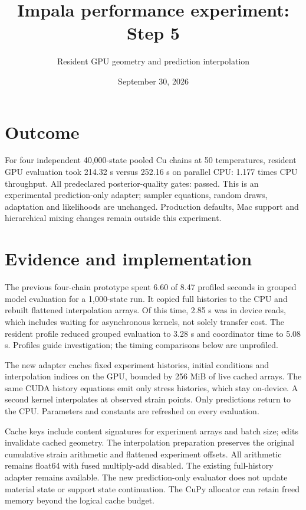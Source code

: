 \documentclass[11pt]{article}
\title{Impala performance experiment: Step 5}
\author{Resident GPU geometry and prediction interpolation}
\date{September 30, 2026}
\begin{document}
\maketitle
\section*{Outcome}
For four independent 40,000-state pooled Cu chains at 50 temperatures, resident
GPU evaluation took 214.32 s versus 252.16 s on parallel CPU:
1.177 times CPU throughput. All predeclared posterior-quality gates: passed.
This is an experimental prediction-only adapter; sampler equations, random draws,
adaptation and likelihoods are unchanged. Production defaults, Mac support and
hierarchical mixing changes remain outside this experiment.
\section*{Evidence and implementation}
The previous four-chain prototype spent 6.60 of 8.47 profiled seconds in grouped
model evaluation for a 1,000-state run. It copied full histories to the CPU and
rebuilt flattened interpolation arrays. Of this time, 2.85 s was in device reads,
which includes waiting for asynchronous kernels, not solely transfer cost.
The resident profile reduced grouped evaluation to 3.28 s and coordinator time
to 5.08 s. Profiles guide investigation; the timing comparisons below are unprofiled.

The new adapter caches fixed experiment histories, initial conditions and
interpolation indices on the GPU, bounded by 256 MiB of live cached arrays.
The same CUDA history equations emit only stress histories, which stay on-device.
A second kernel interpolates at observed strain points. Only predictions return
to the CPU. Parameters and constants are refreshed on every evaluation.

Cache keys include content signatures for experiment arrays and batch size;
edits invalidate cached geometry. The interpolation preparation preserves the
original cumulative strain arithmetic and flattened experiment offsets. All
arithmetic remains float64 with fused multiply-add disabled. The existing
full-history adapter remains available. The new prediction-only evaluator does
not update material state or support state continuation. The CuPy allocator can
retain freed memory beyond the logical cache budget.
\end{document}

